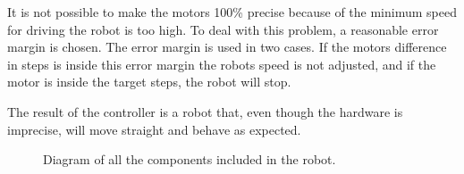 It is not possible to make the motors 100\% precise because of the minimum speed for driving the robot is too high. To deal with this problem, a reasonable error margin is chosen. The error margin is used in two cases. If the motors difference in steps is inside this error margin the robots speed is not adjusted, and if the motor is inside the target steps, the robot will stop.  

The result of the controller is a robot that, even though the hardware is imprecise, will move straight and behave as expected. 

\begin{figure}[H]
     \center{}
     \caption{\label{fig:robot_overview} Diagram of all the components included in the robot.}
\end{figure}

